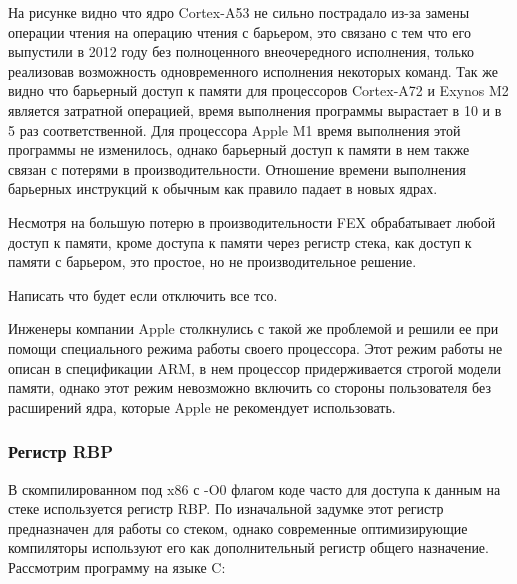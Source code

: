На рисунке видно что ядро Cortex-A53 не сильно пострадало из-за замены операции чтения на операцию чтения с барьером, это связано с тем что его выпустили в 2012 году без полноценного внеочередного исполнения, только реализовав возможность одновременного исполнения некоторых команд. Так же видно что барьерный доступ к памяти для процессоров Cortex-A72 и Exynos M2 является затратной операцией, время выполнения программы вырастает в 10 и в 5 раз соответственной. Для процессора Apple M1 время выполнения этой программы не изменилось, однако барьерный доступ к памяти в нем также связан с потерями в производительности. Отношение времени выполнения барьерных инструкций к обычным как правило падает в новых ядрах.

Несмотря на большую потерю в производительности FEX обрабатывает любой доступ к памяти, кроме доступа к памяти через регистр стека, как доступ к памяти с барьером, это простое, но не производительное решение.

Написать что будет если отключить все тсо.

Инженеры компании Apple столкнулись с такой же проблемой и решили ее при помощи специального режима работы своего процессора. Этот режим работы не описан в спецификации ARM, в нем процессор придерживается строгой модели памяти, однако этот режим невозможно включить со стороны пользователя без расширений ядра, которые Apple не рекомендует использовать.

\subsubsection{Регистр RBP}

В скомпилированном под x86 с -O0 флагом коде часто для доступа к данным на стеке используется регистр RBP. По изначальной задумке этот регистр предназначен для работы со стеком, однако современные оптимизирующие компиляторы используют его как дополнительный регистр общего назначение. Рассмотрим программу на языке C:


